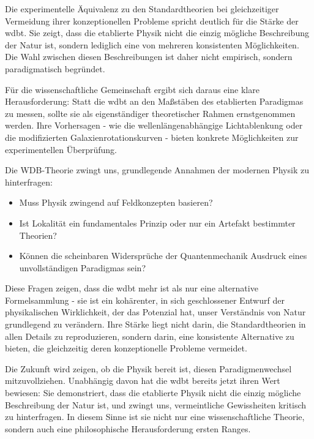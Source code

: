 \documentclass[11pt, a4paper, twoside, openright]{book}
\begin{document}
Die experimentelle Äquivalenz zu den Standardtheorien bei gleichzeitiger Vermeidung ihrer konzeptionellen Probleme spricht deutlich für die Stärke der \gls{wdbt}. Sie zeigt,
dass die etablierte Physik nicht die einzig mögliche Beschreibung der Natur ist, sondern lediglich eine von mehreren konsistenten Möglichkeiten. Die Wahl zwischen diesen Beschreibungen
ist daher nicht empirisch, sondern paradigmatisch begründet.

Für die wissenschaftliche Gemeinschaft ergibt sich daraus eine klare Herausforderung: Statt die \gls{wdbt} an den Maßstäben des etablierten Paradigmas zu messen, sollte sie als
eigenständiger theoretischer Rahmen ernstgenommen werden. Ihre Vorhersagen - wie die wellenlängenabhängige Lichtablenkung oder die modifizierten Galaxienrotationskurven - bieten konkrete
Möglichkeiten zur experimentellen Überprüfung.

Die WDB-Theorie zwingt uns, grundlegende Annahmen der modernen Physik zu hinterfragen:
\begin{itemize}
    \item Muss Physik zwingend auf Feldkonzepten basieren?
    \item Ist Lokalität ein fundamentales Prinzip oder nur ein Artefakt bestimmter Theorien?
    \item Können die scheinbaren Widersprüche der Quantenmechanik Ausdruck eines unvollständigen Paradigmas sein?
\end{itemize}
Diese Fragen zeigen, dass die \gls{wdbt} mehr ist als nur eine alternative Formelsammlung - sie ist ein kohärenter, in sich geschlossener Entwurf der physikalischen Wirklichkeit,
der das Potenzial hat, unser Verständnis von Natur grundlegend zu verändern. Ihre Stärke liegt nicht darin, die Standardtheorien in allen Details zu reproduzieren, sondern darin, eine
konsistente Alternative zu bieten, die gleichzeitig deren konzeptionelle Probleme vermeidet.

Die Zukunft wird zeigen, ob die Physik bereit ist, diesen Paradigmenwechsel mitzuvollziehen. Unabhängig davon hat die \gls{wdbt} bereits jetzt ihren Wert bewiesen: Sie demonstriert,
dass die etablierte Physik nicht die einzig mögliche Beschreibung der Natur ist, und zwingt uns, vermeintliche Gewissheiten kritisch zu hinterfragen. In diesem Sinne ist sie nicht nur eine
wissenschaftliche Theorie, sondern auch eine philosophische Herausforderung ersten Ranges.

\tableofcontents

\mainmatter







\backmatter
\printbibliography[title=Literaturverzeichnis]
\printglossary[title=Glossar]
\printglossary[type=acronym, title=Abkürzungen]
\end{document}
